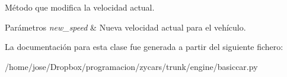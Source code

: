 \-Método que modifica la velocidad actual. 


\begin{DoxyParams}{\-Parámetros}
{\em new\-\_\-speed} & \-Nueva velocidad actual para el vehículo. \\
\hline
\end{DoxyParams}


\-La documentación para esta clase fue generada a partir del siguiente fichero\-:\begin{DoxyCompactItemize}
\item 
/home/jose/\-Dropbox/programacion/zycars/trunk/engine/basiccar.\-py\end{DoxyCompactItemize}
